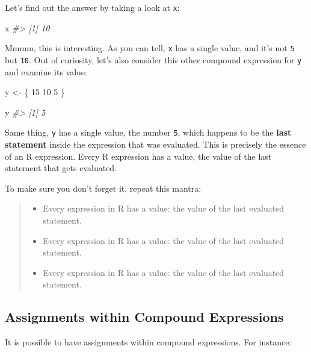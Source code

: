 \documentclass[
]{book}
\newenvironment{Shaded}{\begin{snugshade}}{\end{snugshade}}
\newcommand{\CommentTok}[1]{\textcolor[rgb]{0.56,0.35,0.01}{\textit{#1}}}
\newcommand{\DecValTok}[1]{\textcolor[rgb]{0.00,0.00,0.81}{#1}}
\newcommand{\NormalTok}[1]{#1}
\newcommand{\OtherTok}[1]{\textcolor[rgb]{0.56,0.35,0.01}{#1}}
\begin{document}
Let's find out the answer by taking a look at \texttt{x}:

\begin{Shaded}
\begin{Highlighting}[]
\NormalTok{x}
\CommentTok{\#\textgreater{} [1] 10}
\end{Highlighting}
\end{Shaded}

Mmmm, this is interesting. As you can tell, \texttt{x} has a single value, and it's
not \texttt{5} but \texttt{10}. Out of curiosity, let's also consider this other compound
expression for \texttt{y} and examine its value:

\begin{Shaded}
\begin{Highlighting}[]
\NormalTok{y }\OtherTok{\textless{}{-}}\NormalTok{ \{}
  \DecValTok{15}
  \DecValTok{10}
  \DecValTok{5}
\NormalTok{\}}

\NormalTok{y}
\CommentTok{\#\textgreater{} [1] 5}
\end{Highlighting}
\end{Shaded}

Same thing, \texttt{y} has a single value, the number \texttt{5}, which happens to be the
\textbf{last statement} inside the expression that was evaluated. This is precisely
the essence of an R expression. Every R expression has a value, the value of
the last statement that gets evaluated.

To make sure you don't forget it, repeat this mantra:

\begin{quote}
\begin{itemize}
\item
  Every expression in R has a value: the value of the last evaluated statement.
\item
  Every expression in R has a value: the value of the last evaluated statement.
\item
  Every expression in R has a value: the value of the last evaluated statement.
\end{itemize}
\end{quote}

\hypertarget{assignments-within-compound-expressions}{%
\subsection{Assignments within Compound Expressions}\label{assignments-within-compound-expressions}}

It is possible to have assignments within compound expressions. For instance:
\end{document}
